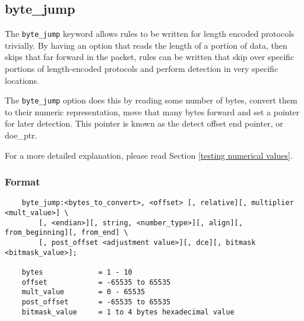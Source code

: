 \documentclass[english]{report}
\begin{document}
\subsection{byte\_jump}
\label{sub:byte_jump}

The \texttt{byte\_jump} keyword allows rules to be written for length encoded
protocols trivially. By having an option that reads the length of a portion of
data, then skips that far forward in the packet, rules can be written that skip
over specific portions of length-encoded protocols and perform detection in
very specific locations.

The \texttt{byte\_jump} option does this by reading some number of bytes,
convert them to their numeric representation, move that many bytes forward and
set a pointer for later detection.  This pointer is known as the detect offset
end pointer, or doe\_ptr.

For a more detailed explanation, please read Section \ref{testing numerical
values}.

\subsubsection{Format}

\begin{verbatim}
    byte_jump:<bytes_to_convert>, <offset> [, relative][, multiplier <mult_value>] \
        [, <endian>][, string, <number_type>][, align][, from_beginning][, from_end] \ 
        [, post_offset <adjustment value>][, dce][, bitmask <bitmask_value>];

    bytes             = 1 - 10
    offset            = -65535 to 65535
    mult_value        = 0 - 65535
    post_offset       = -65535 to 65535
    bitmask_value     = 1 to 4 bytes hexadecimal value
 
\end{verbatim}
\end{document}

